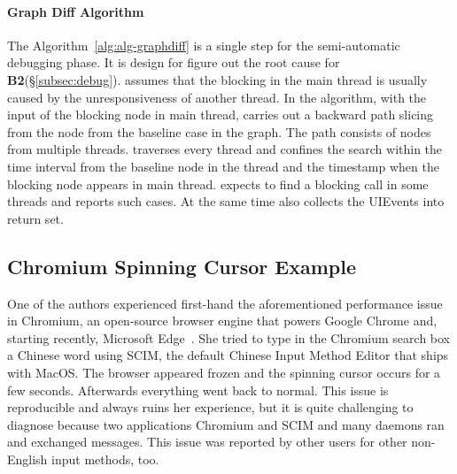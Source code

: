 \paragraph{Graph Diff Algorithm}

The Algorithm~\ref{alg:alg-graphdiff} is a single step for the semi-automatic
debugging phase. It is design for figure out the root cause for
\textbf{B2}(\S\ref{subsec:debug}). \xxx assumes that the blocking in the main
thread is usually caused by the unresponsiveness of another thread. In the
algorithm, with the input of the blocking node in main thread, \xxx carries
out a backward path slicing from the node from the baseline case in the graph.
The path consists of nodes from multiple threads. \xxx traverses every thread
and confines the search within the time interval from the baseline node in the
thread and the timestamp when the blocking node appears in main thread. \xxx
expects to find a blocking call in some threads and reports such cases. At the
same time \xxx also collects the UIEvents into return set.

\subsection{Chromium Spinning Cursor Example}


One of the authors experienced first-hand the aforementioned performance issue
in Chromium, an open-source browser engine that powers Google Chrome and,
starting recently, Microsoft Edge~\cite{chromiumurl}.  She tried to type in the
Chromium search box a Chinese word using SCIM, the default Chinese Input Method
Editor that ships with MacOS.  The browser appeared frozen and the spinning
cursor occurs for a few seconds.  Afterwards everything went back to normal.
This issue is reproducible and always ruins her experience, but it is quite
challenging to diagnose because two applications Chromium and SCIM and many
daemons ran and exchanged messages.  This issue was reported by other users for
other non-English input methods, too.


